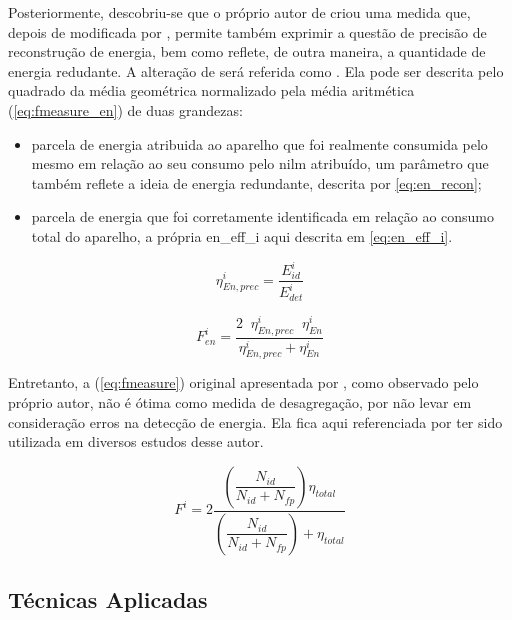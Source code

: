 Posteriormente, descobriu-se que o próprio autor de
\cite{nilm_zeifman_review_2011} criou uma medida que, depois de
modificada por \cite{seminilm_fhmm_empiricalnmeter_2013}, permite
também exprimir a questão de precisão de reconstrução de energia, bem
como reflete, de outra maneira, a quantidade de energia redudante. 
A alteração de \cite{seminilm_fhmm_empiricalnmeter_2013} será referida
como .
Ela pode ser descrita pelo quadrado da média geométrica normalizado
pela média aritmética (\ref{eq:fmeasure_en}) de duas grandezas: 

\begin{itemize}
\item parcela de energia atribuida ao aparelho que foi realmente
consumida pelo mesmo em relação ao seu consumo pelo \gls{nilm}
atribuído, um parâmetro que também reflete a ideia de energia
redundante, descrita por \ref{eq:en_recon};
\item parcela de energia que foi corretamente identificada em relação
ao consumo total do aparelho, a própria \gls{en_eff_i} aqui descrita
em \ref{eq:en_eff_i}.
\end{itemize}

\begin{equation}\label{eq:en_recon}
\eta_{En,prec}^i = \frac{E_{id}^i}{E_{det}^i}
\end{equation}

\begin{equation}\label{eq:fmeasure_en}
F_{en}^i=\frac{2 \;\; \eta_{En,prec}^i \;\; \eta_{En}^i}{\eta_{En,prec}^i+\eta_{En}^i}
\end{equation}

Entretanto, a  (\ref{eq:fmeasure}) original
apresentada por \citet*{nilm_zeifman_vastext_approach_2012}, como
observado pelo próprio autor, não é ótima como medida de desagregação,
por não levar em consideração erros na detecção de energia. Ela fica
aqui referenciada por ter sido utilizada em diversos estudos desse
autor.

\begin{equation}\label{eq:fmeasure}
F^i=2\dfrac{\left(\dfrac{N_{id}}{N_{id}+N_{fp}}\right)\eta_{total}}
{\left(\dfrac{N_{id}}{N_{id}+N_{fp}}\right)+\eta_{total}}
\end{equation}


\subsection{Técnicas Aplicadas}
\label{ssec:nilm_tecnicas}

